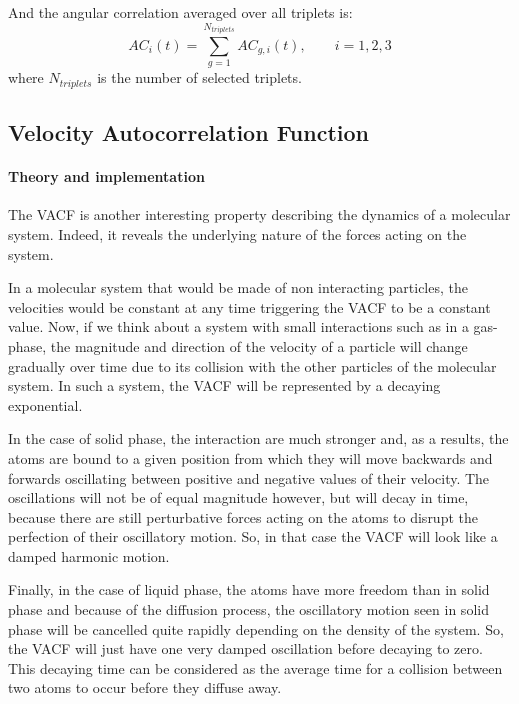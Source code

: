 \documentclass[a4paper,11pt]{article}
\begin{document}
And the angular correlation averaged over all triplets is:
\begin{equation}
\label{eq:ac}
AC_i(t) = \sum_{g=1}^{N_{triplets}} AC_{g,i}(t), \qquad  i = 1,2,3
\end{equation}
where $N_{triplets}$ is the number of selected triplets.

\subsection{Velocity Autocorrelation Function}
\label{vacf}
\paragraph{Theory and implementation\\}
\label{vacf_theory}
The \gls{VACF} is another interesting property describing the dynamics of a 
molecular system. Indeed, it reveals the underlying nature of the forces acting on the system. 

In a molecular system that would be made of non interacting particles, the velocities would be constant at 
any time triggering the \gls{VACF} to be a constant value. Now, if we think about a system with small interactions such as in a
gas-phase, the magnitude and direction of the velocity of a particle will change gradually over time due to its 
collision with the other particles of the molecular system. In such a system, the \gls{VACF} will be represented by a
decaying exponential.

In the case of solid phase, the interaction are much stronger and, as a results, the atoms are bound to a given 
position from which they will move backwards and forwards oscillating between positive and negative values of 
their velocity. The oscillations will not be of equal magnitude however, but will decay in time, because there 
are still perturbative forces acting on the atoms to disrupt the perfection of their oscillatory motion. So, in 
that case the \gls{VACF} will look like a damped harmonic motion.

Finally, in the case of liquid phase, the atoms have more freedom than in solid phase and because of the diffusion 
process, the oscillatory motion seen in solid phase will be cancelled quite rapidly depending on the density of the
system. So, the \gls{VACF} will just have one very damped oscillation before decaying to zero. This decaying time can be
considered as the average time for a collision between two atoms to occur before they diffuse away.
\end{document}

